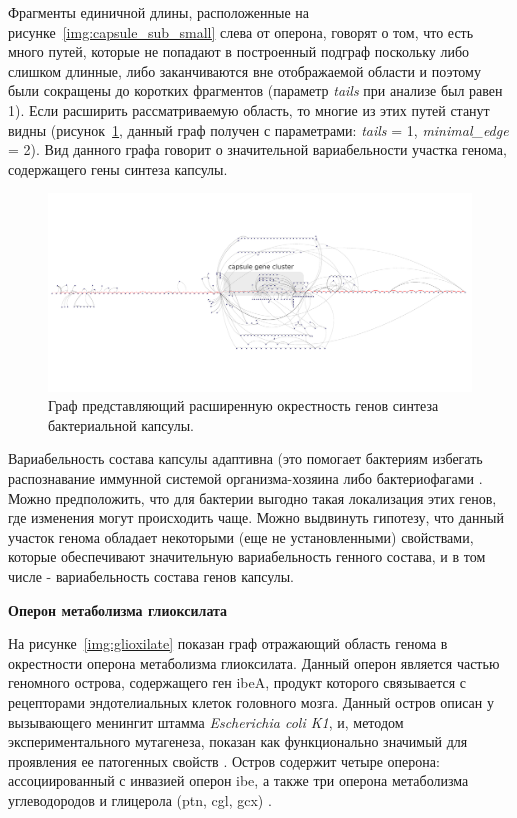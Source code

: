 Фрагменты единичной длины, расположенные на рисунке~\ref{img:capsule_sub_small} слева от оперона, говорят о том, что есть много путей, которые не попадают в построенный подграф поскольку либо слишком длинные, либо заканчиваются вне отображаемой области и поэтому были сокращены до коротких фрагментов (параметр \textit{tails} при анализе был равен 1). Если расширить рассматриваемую область, то многие из этих путей станут видны (рисунок~\ref{img:capsule_sub_large}, данный граф получен с параметрами: \textit{tails} = 1, \textit{minimal\_edge} = 2). Вид данного графа говорит о значительной вариабельности участка генома, содержащего гены синтеза капсулы.

\begin{figure}[!ht] 
  \center
    \includegraphics[width=\textwidth]{Dissertation/images/subgraphs/capsular_subgraph.pdf}
  \caption{Граф представляющий расширенную окрестность генов синтеза бактериальной капсулы. }
  \label{img:capsule_sub_large} 
\end{figure}

Вариабельность состава капсулы адаптивна (это помогает бактериям избегать распознавание иммунной системой организма-хозяина либо бактериофагами \cite{cress2014masquerading, lukavcova2008role}. Можно предположить, что для бактерии выгодно такая локализация этих генов, где изменения могут происходить чаще. Можно выдвинуть гипотезу, что данный участок генома обладает некоторыми (еще не установленными) свойствами, которые обеспечивают значительную вариабельность генного состава, и в том числе - вариабельность состава генов капсулы.

\textbf{Оперон метаболизма глиоксилата}

На рисунке~\ref{img:glioxilate} показан граф отражающий область генома в окрестности оперона метаболизма глиоксилата. Данный оперон является частью геномного острова, содержащего ген ibeA, продукт которого связывается с рецепторами эндотелиальных клеток головного мозга. Данный остров описан у вызывающего менингит штамма \textit{Escherichia coli K1}, и, методом экспериментального мутагенеза, показан как функционально значимый для проявления ее патогенных свойств \cite{huang2001novel}. Остров содержит четыре оперона: ассоциированный с инвазией оперон ibe, а также три оперона метаболизма углеводородов и глицерола (ptn, cgl, gcx) \cite{rakitina2017genome}. 

